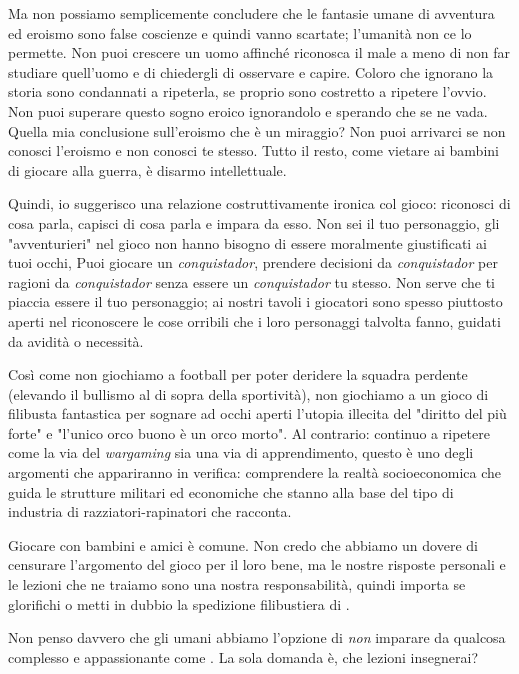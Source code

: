 Ma non possiamo semplicemente concludere che le fantasie umane di avventura ed eroismo sono false coscienze e quindi vanno scartate; l'umanità non ce lo permette. Non puoi crescere un uomo affinché riconosca il male a meno di non far studiare quell'uomo e di chiedergli di osservare e capire. Coloro che ignorano la storia sono condannati a ripeterla, se proprio sono costretto a ripetere l'ovvio. Non puoi superare questo sogno eroico ignorandolo e sperando che se ne vada. Quella mia conclusione sull'eroismo che è un miraggio? Non puoi arrivarci se non conosci l'eroismo e non conosci te stesso. Tutto il resto, come vietare ai bambini di giocare alla guerra, è disarmo intellettuale.

Quindi, io suggerisco una relazione costruttivamente ironica col gioco: riconosci di cosa parla, capisci di cosa parla e impara da esso. Non sei il tuo personaggio, gli "avventurieri" nel gioco non hanno bisogno di essere moralmente giustificati ai tuoi occhi, Puoi giocare un \textit{conquistador}, prendere decisioni da \textit{conquistador} per ragioni da \textit{conquistador} senza essere un \textit{conquistador} tu stesso. Non serve che ti piaccia essere il tuo personaggio; ai nostri tavoli i giocatori sono spesso piuttosto aperti nel riconoscere le cose orribili che i loro personaggi talvolta fanno, guidati da avidità o necessità.

Così come non giochiamo a football per poter deridere la squadra perdente (elevando il bullismo al di sopra della sportività), non giochiamo a un gioco di filibusta fantastica per sognare ad occhi aperti l'utopia illecita del "diritto del più forte" e "l'unico orco buono è un orco morto". Al contrario: continuo a ripetere come la via del \textit{wargaming} sia una via di apprendimento, questo è uno degli argomenti che appariranno in verifica: comprendere la realtà socioeconomica che guida le strutture militari ed economiche che stanno alla base del tipo di industria di razziatori-rapinatori che \dnd racconta.

Giocare con bambini e amici è comune. Non credo che abbiamo un dovere di censurare l'argomento del gioco per il loro bene, ma le nostre risposte personali e le lezioni che ne traiamo sono una nostra responsabilità, quindi importa se glorifichi o metti in dubbio la spedizione filibustiera di \dnd{}.

Non penso davvero che gli umani abbiamo l'opzione di \textit{non} imparare da qualcosa complesso e appassionante come \dnd{}. La sola domanda è, che lezioni insegnerai?